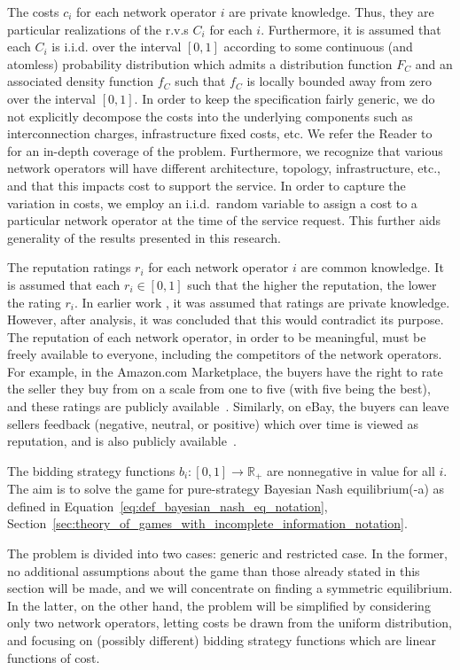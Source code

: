 The costs $c_i$ for each network operator $i$ are private knowledge. Thus, they are particular realizations of the r.v.s $C_i$ for each $i$. Furthermore, it is assumed that each $C_i$ is i.i.d. over the interval $[0,1]$ according to some continuous (and atomless) probability distribution which admits a distribution function $F_{C}$ and an associated density function $f_{C}$ such that $f_C$ is locally bounded away from zero over the interval $[0,1]$. In order to keep the specification fairly generic, we do not explicitly decompose the costs into the underlying components such as interconnection charges, infrastructure fixed costs, etc. We refer the Reader to~\cite{Njoroge2009,LeCadre2009,HauBrenner2009} for an in-depth coverage of the problem. Furthermore, we recognize that various network operators will have different architecture, topology, infrastructure, etc., and that this impacts cost to support the service. In order to capture the variation in costs, we employ an i.i.d.~random variable to assign a cost to a particular network operator at the time of the service request. This further aids generality of the results presented in this research.

The reputation ratings $r_i$ for each network operator $i$ are common knowledge. It is assumed that each $r_i\in [0,1]$ such that the higher the reputation, the lower the rating $r_i$. In earlier work \cite{DMKonkaUbi11}, it was assumed that ratings are private knowledge. However, after analysis, it was concluded that this would contradict its purpose. The reputation of each network operator, in order to be meaningful, must be freely available to everyone, including the competitors of the network operators. For example, in the Amazon.com Marketplace, the buyers have the right to rate the seller they buy from on a scale from one to five (with five being the best), and these ratings are publicly available~\cite{AMAZON}. Similarly, on eBay, the buyers can leave sellers feedback (negative, neutral, or positive) which over time is viewed as reputation, and is also publicly available~\cite{EBAY}.
	
The bidding strategy functions $b_i: [0,1]\to\mathbb{R_+}$ are nonnegative in value for all $i$. The aim is to solve the game for pure-strategy Bayesian Nash equilibrium(-a) as defined in Equation~\eqref{eq:def_bayesian_nash_eq_notation}, Section~\ref{sec:theory_of_games_with_incomplete_information_notation}.

The problem is divided into two cases: generic and restricted case. In the former, no additional assumptions about the game than those already stated in this section will be made, and we will concentrate on finding a symmetric equilibrium. In the latter, on the other hand, the problem will be simplified by considering only two network operators, letting costs be drawn from the uniform distribution, and focusing on (possibly different) bidding strategy functions which are linear functions of cost.

